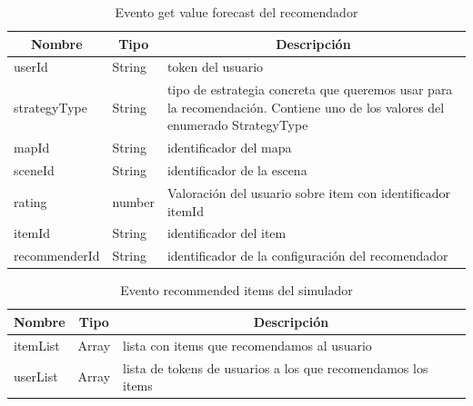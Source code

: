 \begin{table}[H]
	\centering
	\label{my-label}
	\begin{tabular}{|l|l|p{7cm}|}
		\hline
		\multicolumn{1}{|c|}{\textbf{Nombre}} & \multicolumn{1}{c|}{\textbf{Tipo}} & \multicolumn{1}{c|}{\textbf{Descripción}}                                                                                   \\ \hline
		userId                                & String                             & token del usuario                                                                                                           \\ \hline
		strategyType                          & String                             & tipo de estrategia concreta que queremos usar para la recomendación. Contiene uno de los valores del enumerado StrategyType \\ \hline
		mapId                                 & String                             & identificador del mapa                                                                                                      \\ \hline
		sceneId                               & String                             & identificador de la escena                                                                                                  \\ \hline
		rating                                & number                             & Valoración del usuario sobre item con identificador itemId                                                                  \\ \hline
		itemId                                & String                             & identificador del item                                                                                                      \\ \hline
		recommenderId                         & String                             & identificador de la configuración del recomendador                                                                          \\ \hline
	\end{tabular}
	\caption{Evento get value forecast del recomendador}
\end{table}

\begin{table}[H]
	\centering
	\label{my-label}
	\begin{tabular}{|l|l|l|}
		\hline
		\multicolumn{1}{|c|}{\textbf{Nombre}} & \multicolumn{1}{c|}{\textbf{Tipo}} & \multicolumn{1}{c|}{\textbf{Descripción}}                    \\ \hline
		itemList                              & Array                              & lista con items que recomendamos al usuario                  \\ \hline
		userList                              & Array                              & lista de tokens de usuarios a los que recomendamos los items \\ \hline
	\end{tabular}
	\caption{Evento recommended items del simulador}
\end{table}

